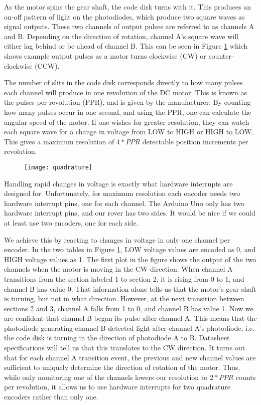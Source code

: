 As the motor spins the gear shaft, the code disk turns with it. This produces an on-off pattern of light on the photodiodes, which produce two square waves as signal outputs. These two channels of output pulses are referred to as channels A and B. Depending on the direction of rotation, channel A's square wave will either lag behind or be ahead of channel B. This can be seen in Figure \ref{FigQuadChannels} which shows example output pulses as a motor turns clockwise (CW) or counter-clockwise (CCW). \cite{encoderBlog}

The number of slits in the code disk corresponds directly to how many pulses each channel will produce in one revolution of the DC motor. This is known as the pulses per revolution (PPR), and is given by the manufacturer. By counting how many pulses occur in one second, and using the PPR, one can calculate the angular speed of the motor. If one wishes for greater resolution, they can watch each square wave for a change in voltage from LOW to HIGH or HIGH to LOW. This gives a maximum resolution of \(4 * PPR\) detectable position increments per revolution.

\begin{figure}[h]
	\caption{\cite{fig_quad_channels}}
	\centering
	\texttt{[image: quadrature]}
	\label{FigQuadChannels}
\end{figure}

Handling rapid changes in voltage is exactly what hardware interrupts are designed for. Unfortunately, for maximum resolution each encoder needs two hardware interrupt pins, one for each channel. The Arduino Uno only has two hardware interrupt pins, and our rover has two sides. It would be nice if we could at least use two encoders, one for each side.

We achieve this by reacting to changes in voltage in only one channel per encoder. In the two tables in Figure \ref{FigQuadChannels}, LOW voltage values are encoded as 0, and HIGH voltage values as 1. The first plot in the figure shows the output of the two channels when the motor is moving in the CW direction.  When channel A transitions from the section labeled 1 to section 2, it is rising from 0 to 1, and channel B has value 0. That information alone tells us that the motor's gear shaft is turning, but not in what direction. However, at the next transition between sections 2 and 3, channel A falls from 1 to 0, and channel B has value 1. Now we are confident that channel B began its pulse after channel A. This means that the photodiode generating channel B detected light after channel A's photodiode, i.e. the code disk is turning in the direction of photodiode A to B. Datasheet specifications will tell us that this translates to the CW direction. It turns out that for each channel A transition event, the previous and new channel values are sufficient to uniquely determine the direction of rotation of the motor. Thus, while only monitoring one of the channels lowers our resolution to \(2 * PPR\) counts per revolution, it allows us to use hardware interrupts for two quadrature encoders rather than only one. \cite{encoderBlog}

